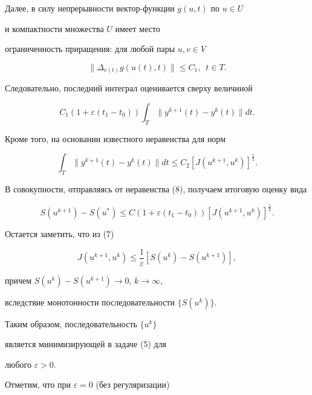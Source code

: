Далее, в силу непрерывности вектор-функции $g(u,t)$ по $u\in U$ 


и компактности множества $U$ имеет место 


ограниченность приращения: для любой пары $u,v\in V$


$$


\|\Delta_{v(t)}g(u(t),t)\|\leq C_{1},\ \;t\in T.


$$


Следовательно, последний интеграл оценивается сверху величиной


$$


C_{1}(1+\varepsilon(t_{1}-t_{0}))\int_{T}\|y^{k+1}(t)-y^{k}(t)\|dt.


$$


Кроме того, на основании известного неравенства для норм


$$


\int_{T}\|y^{k+1}(t)-y^{k}(t)\|dt\leq C_{2}[J(u^{k+1},u^{k})]^{\frac{1}{2}}.


$$


В совокупности, отправляясь от неравенства (8), получаем итоговую оценку вида 


\begin{equation}


S(u^{k+1})-S(u^{*})\leq C(1+\varepsilon(t_{1}-t_{0}))


[J(u^{k+1},u^{k})]^{\frac{1}{2}}.


\end{equation}


Остается заметить, что из (7) 


\begin{equation}


J(u^{k+1},u^{k})\leq \frac{1}{\varepsilon}[S(u^{k})-S(u^{k+1})],


\end{equation}


причем $S(u^{k})-S(u^{k+1})\rightarrow 0$, $k\rightarrow \infty$,


вследствие монотонности последовательности $\{S(u^{k})\}$.





Таким образом, последовательность $\{u^{k}\}$ 


является минимизирующей в задаче (5) для


любого $\varepsilon>0$.





Отметим, что при $\varepsilon=0$ (без регуляризации) 


